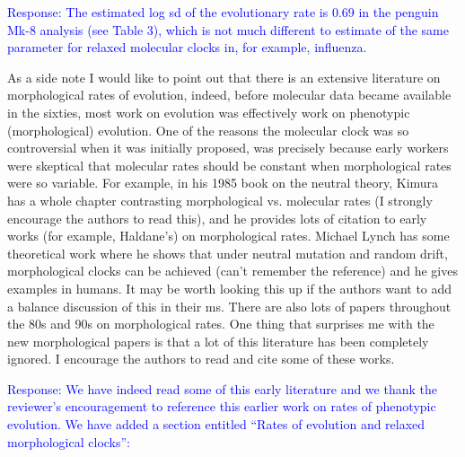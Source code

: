 \documentclass[11pt]{article}
\newcommand{\response}[1]{\medskip{}\textcolor{blue}{{Response: #1}}\medskip{}}
\begin{document}
\response{The estimated log sd of the evolutionary rate is 0.69 in the penguin Mk-8 analysis (see Table 3), which is not much different to estimate of the same parameter for relaxed molecular clocks in, for example, influenza.}

As a side note I would like to point out that there is an extensive literature on morphological rates of evolution, indeed, before molecular data became available in the sixties, most work on evolution was effectively work on phenotypic (morphological) evolution. One of the reasons the molecular clock was so controversial when it was initially proposed, was precisely because early workers were skeptical that molecular rates should be constant when morphological rates were so variable. For example, in his 1985 book on the neutral theory, Kimura has a whole chapter contrasting morphological vs. molecular rates (I strongly encourage the authors to read this), and he provides lots of citation to early works (for example, Haldane's) on morphological rates. Michael Lynch has some theoretical work where he shows that under neutral mutation and random drift, morphological clocks can be achieved (can't remember the reference) and he gives examples in humans. It may be worth looking this up if the authors want to add a balance discussion of this in their ms. There are also lots of papers throughout the 80s and 90s on morphological rates. One thing that surprises me with the new morphological papers is that a lot of this literature has been completely ignored. I encourage the authors to read and cite some of these works.

\response{We have indeed read some of this early literature and we thank the reviewer's encouragement to reference this earlier work on rates of phenotypic evolution. We have added a section entitled ``Rates of evolution and relaxed morphological clocks'':}

\end{document}
